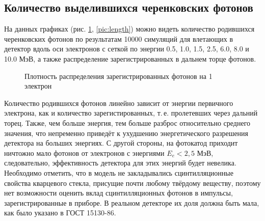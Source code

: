 \documentclass[12pt,a4paper]{report} %
\begin{document}
\subsection{Количество выделившихся черенковских фотонов}
На данных графиках (рис. \ref{Cercount}, \ref{pic:length}) можно видеть количество родившихся черенковских фотонов по результатам 10000 симуляций для влетающих в детектор вдоль оси электронов с сеткой по энергии 0.5, 1.0, 1.5, 2.5, 6.0, 8.0 и 10.0 МэВ, а также распределение зарегистрированных в дальнем торце фотонов. 
\begin{figure}[bh]
\caption{Количество родившихся фотонов на 1 электрон}
\label{Cercount}
\caption{Плотность распределения зарегистрированных фотонов на 1 электрон}
\end{figure}
Количество родившихся фотонов линейно зависит от энергии первичного электрона, как и количество зарегистированных, т.\,е. пролетевших через дальний торец. Также, чем больше энергия, тем больше разброс относительно среднего значения, что непременно приведёт к ухудшению энергетического разрешения детектора на больших энергиях. С другой стороны, на фотокатод приходит ничтожно мало фотонов от электронов с энергиями $E_e<2,5$ МэВ, следовательно, эффективность детектора для этих энергий будет невелика. Необходимо отметить, что в модель не закладывались сцинтилляционные свойства кварцевого стекла, присущие почти любому твёрдому веществу, поэтому нет возможности оценить вклад сцинтилляционных фотонов в импульсы, зарегистрированные в приборе. В реальном детекторе их доля должна быть мала, как было указано в ГОСТ 15130-86.
\end{document}
